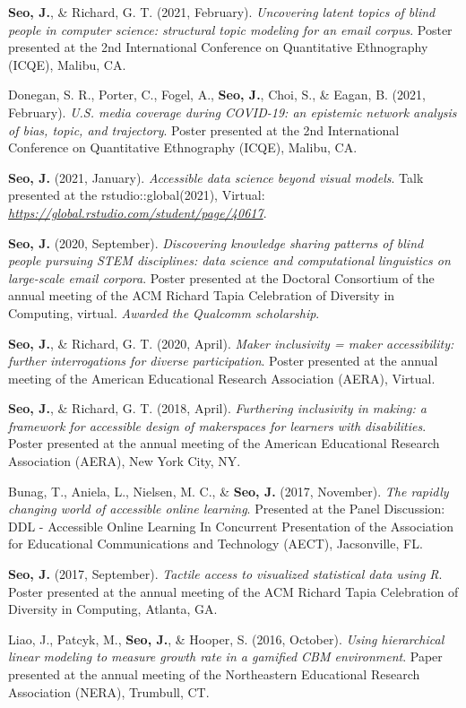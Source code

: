 \documentclass[11pt,a4paper,]{awesome-cv}
\begin{document}
\textbf{Seo, J.}, \& Richard, G. T. (2021, February). \emph{Uncovering
latent topics of blind people in computer science: structural topic
modeling for an email corpus}. Poster presented at the 2nd International
Conference on Quantitative Ethnography (ICQE), Malibu, CA.

Donegan, S. R., Porter, C., Fogel, A., \textbf{Seo, J.}, Choi, S., \&
Eagan, B. (2021, February). \emph{U.S. media coverage during COVID-19:
an epistemic network analysis of bias, topic, and trajectory}. Poster
presented at the 2nd International Conference on Quantitative
Ethnography (ICQE), Malibu, CA.

\textbf{Seo, J.} (2021, January). \emph{Accessible data science beyond
visual models}. Talk presented at the rstudio::global(2021), Virtual:
\emph{\url{https://global.rstudio.com/student/page/40617}}.

\textbf{Seo, J.} (2020, September). \emph{Discovering knowledge sharing
patterns of blind people pursuing STEM disciplines: data science and
computational linguistics on large-scale email corpora}. Poster
presented at the Doctoral Consortium of the annual meeting of the ACM
Richard Tapia Celebration of Diversity in Computing, virtual.
\emph{Awarded the Qualcomm scholarship}.

\textbf{Seo, J.}, \& Richard, G. T. (2020, April). \emph{Maker
inclusivity = maker accessibility: further interrogations for diverse
participation}. Poster presented at the annual meeting of the American
Educational Research Association (AERA), Virtual.

\textbf{Seo, J.}, \& Richard, G. T. (2018, April). \emph{Furthering
inclusivity in making: a framework for accessible design of makerspaces
for learners with disabilities}. Poster presented at the annual meeting
of the American Educational Research Association (AERA), New York City,
NY.

Bunag, T., Aniela, L., Nielsen, M. C., \& \textbf{Seo, J.} (2017,
November). \emph{The rapidly changing world of accessible online
learning}. Presented at the Panel Discussion: DDL - Accessible Online
Learning In Concurrent Presentation of the Association for Educational
Communications and Technology (AECT), Jacsonville, FL.

\textbf{Seo, J.} (2017, September). \emph{Tactile access to visualized
statistical data using R}. Poster presented at the annual meeting of the
ACM Richard Tapia Celebration of Diversity in Computing, Atlanta, GA.

Liao, J., Patcyk, M., \textbf{Seo, J.}, \& Hooper, S. (2016, October).
\emph{Using hierarchical linear modeling to measure growth rate in a
gamified CBM environment}. Paper presented at the annual meeting of the
Northeastern Educational Research Association (NERA), Trumbull, CT.
\end{document}
